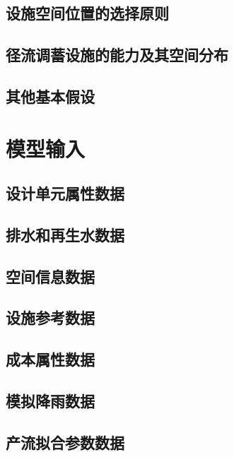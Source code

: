 \documentclass[degree=doctor]{thuthesis}
\begin{document}
\clearpage
\setcounter{page}{67}
\subsection{设施空间位置的选择原则}

\clearpage
\setcounter{page}{68}
\subsection{径流调蓄设施的能力及其空间分布}

\clearpage
\setcounter{page}{69}
\subsection{其他基本假设}
\section{模型输入}
\subsection{设计单元属性数据}

\clearpage
\setcounter{page}{70}
\subsection{排水和再生水数据}

\clearpage
\setcounter{page}{72}
\subsection{空间信息数据}

\clearpage
\setcounter{page}{73}
\subsection{设施参考数据}

\clearpage
\setcounter{page}{74}
\subsection{成本属性数据}

\clearpage
\setcounter{page}{77}
\subsection{模拟降雨数据}
\subsection{产流拟合参数数据}
\end{document}
